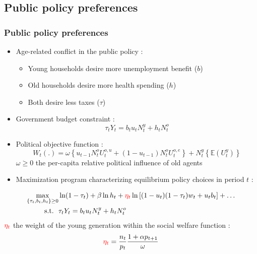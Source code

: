\documentclass{beamer}
\begin{document}
		\subsection{Public policy preferences}
			\begin{frame}\frametitle{Public policy preferences}
				\begin{itemize}
					\item Age-related conflict in the public policy :
					\begin{itemize}
						\item Young households desire more unemployment benefit ($b$)
						\item Old households desire more health spending ($h$)
						\item Both desire less taxes ($\tau$)
					\end{itemize}
				\end{itemize}
				\begin{itemize}
					\item Government budget constraint :
						\begin{equation*}
						\tau_t Y_t = b_t u_t N^y_t + h_t N^o_t
						\end{equation*}
				\end{itemize}
				\begin{itemize}
					\item Political objective function :
						\begin{equation*}
						W_t(.) = \omega\left\lbrace u_{t-1}N_t^o U_t^{o,u} + (1-u_{t-1}) N_t^o U_t^{o,e} \right\rbrace + N_t^y \left\lbrace\mathbb{E}\left(U^y_t\right)\right\rbrace
						\end{equation*}
					$\omega \geq 0$ the per-capita relative political influence of old agents
				\end{itemize}
			\end{frame}
			\begin{frame}
				\begin{itemize}
					\item Maximization program characterizing equilibrium policy choices in period $t$ :
				\end{itemize}
					\begin{align*}
						\max_{\lbrace\tau_t, b_t, h_t\rbrace\geq 0} &\ln(1-\tau_t) +\beta \ln h_t + \textcolor{red}{\eta_t} \ln\left[(1-u_t)(1-\tau_t)w_t + u_t b_t\right] + \dots\\
						\text{s.t.} ~~ &\tau_t Y_t = b_t u_t N_t^y + h_t N_t^o
					\end{align*}
					$\textcolor{red}{\eta_t}$ the weight of the young generation within the social welfare function :\\
					\begin{equation*}
						\textcolor{red}{\eta_t} = \frac{n_t}{p_t}\frac{1+\alpha p_{t+1}}{\omega}
					\end{equation*}
			\end{frame}
\end{document}

